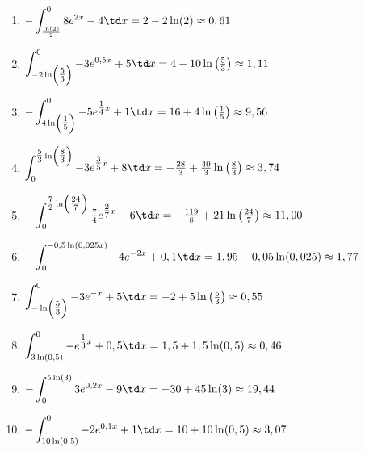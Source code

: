 \begin{Answer}[ref=flaecheRechnA2]\\
	\begin{enumerate}[label=\alph*)]
		\item \(\displaystyle-\int_{\frac{\ln(2)}{2}}^{0} 8e^{2x}-4 \td x=2-2\ln(2)\approx 0,61\)\\
		\item \(\displaystyle\int_{-2\ln\left(\tfrac{5}{3}\right)}^{0} -3e^{0,5x}+5 \td x=4-10\ln\left(\tfrac{5}{3}\right)\approx1,11\)\\
		\item \(\displaystyle-\int_{4\ln\left(\tfrac{1}{5}\right)}^{0} -5e^{\tfrac{1}{4}x}+1 \td x=16+4\ln\left(\tfrac{1}{5}\right)\approx 9,56\)\\
		\item \(\displaystyle\int_{0}^{\tfrac{5}{3}\ln\left(\tfrac{8}{3}\right)} -3e^{\tfrac{3}{5}x}+8 \td x=-\tfrac{28}{3}+\tfrac{40}{3}\ln\left(\tfrac{8}{3}\right)\approx 3,74\)\\
		\item \(\displaystyle-\int_{0}^{\tfrac{7}{2}\ln\left(\tfrac{24}{7}\right)} \tfrac{7}{4}e^{\tfrac{2}{7}x}-6 \td x=-\tfrac{119}{8}+21\ln\left(\tfrac{24}{7}\right)\approx 11,00\)\\
		\item \(\displaystyle-\int_{0}^{-0,5\ln(0,025x)} -4e^{-2x}+0,1 \td x= 1,95+0,05\ln(0,025)\approx 1,77\)\\
		\item \(\displaystyle\int_{-\ln\left(\tfrac{5}{3}\right)}^{0} -3e^{-x}+5 \td x=-2+5\ln\left(\tfrac{5}{3}\right)\approx 0,55\)\\
		\item \(\displaystyle\int_{3\ln(0,5)}^{0} -e^{\tfrac{1}{3}x}+0,5 \td x=1,5+1,5\ln(0,5)\approx 0,46\)\\
		\item \(\displaystyle-\int_{0}^{5\ln(3)} 3e^{0,2x}-9 \td x=-30+45\ln(3)\approx 19,44\)\\
		\item \(\displaystyle-\int_{10\ln(0,5)}^{0} -2e^{0,1x}+1 \td x=10+10\ln(0,5)\approx 3,07\)
	\end{enumerate}
\end{Answer}